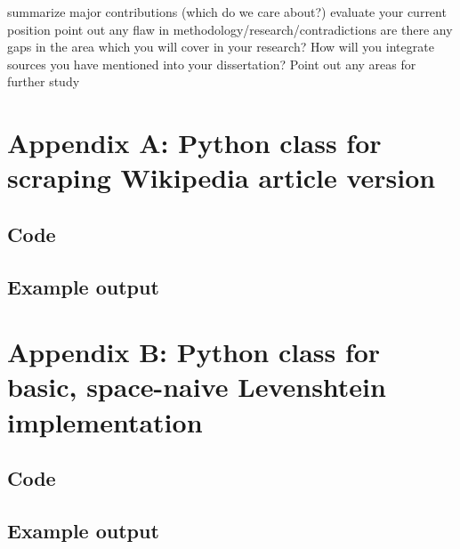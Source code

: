\documentclass[a4paper,11pt,twoside,notitlepage]{article}
\begin{document}
        summarize major contributions (which do we care about?)
        evaluate your current position
        point out any flaw in methodology/research/contradictions
        are there any gaps in the area which you will cover in your research?
        How will you integrate sources you have mentioned into your dissertation?
        Point out any areas for further study

\clearpage
\begin{appendices}
\section{Appendix A: Python class for scraping Wikipedia article version}
\subsection{Code}

\subsection{Example output}

\clearpage
\section{Appendix B: Python class for basic, space-naive Levenshtein
  implementation}
\subsection{Code}

\subsection{Example output}
\end{appendices}

{}
	
\end{document}
